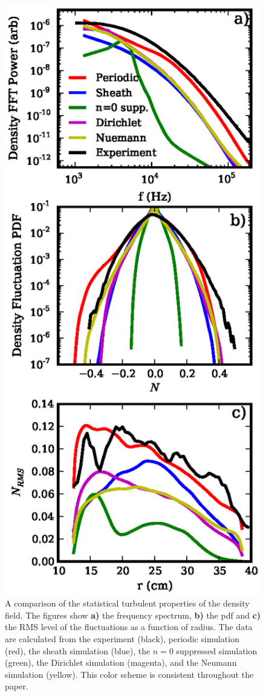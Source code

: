 \documentclass[showpacs,preprintnumbers,amsmath,amssymb,superscriptaddress,aip]{revtex4-1}
\begin{document}
\begin{figure}[!htbp]
\includegraphics[]{statistics}
\hfil
\caption{A comparison of the statistical turbulent properties of the density field. The figures show \textbf{a)} the frequency spectrum, \textbf{b)} the pdf and \textbf{c)} the RMS level
of the fluctuations as a function of radius. The data are calculated from the experiment (black), periodic simulation (red), 
the sheath simulation (blue), the $n=0$ suppressed simulation (green), the Dirichlet simulation (magenta), and the Neumann simulation (yellow). This color scheme is consistent throughout the paper.}
\label{statistics}
\end{figure}
\end{document}

